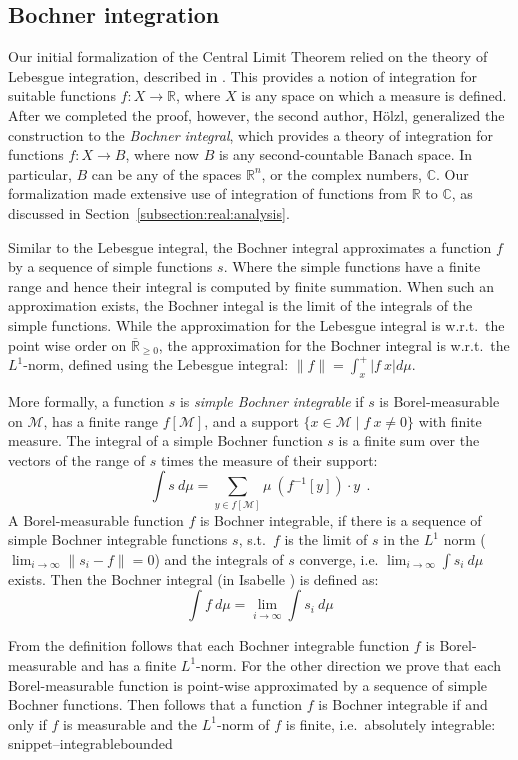 \documentclass{svjour3}
\newcommand{\RR}{\mathbb{R}}
\newcommand{\CC}{\mathbb{C}}
\newcommand{\ennRR}{\overline{\mathbb{R}}_{\ge 0}}
\newcommand{\mdl}[1]{{\mathcal #1}} %
\newcommand{\Snippet}[1]{\csname snippet--#1\endcsname}
\begin{document}
\subsection{Bochner integration}
\label{subsection:bochner}

Our initial formalization of the Central Limit Theorem relied on the theory of Lebesgue integration, described in \cite{hoelzl:heller:11}. This provides a notion of integration for suitable functions $f : X \to \RR$, where $X$ is any space on which a measure is defined. After we completed the proof, however, the second author, H\"olzl, generalized the construction to the \emph{Bochner integral}, which provides a theory of integration for functions $f : X \to B$, where now $B$ is any second-countable Banach space. In particular, $B$ can be any of the spaces $\RR^n$, or the complex numbers, $\CC$. Our formalization made extensive use of integration of functions from $\RR$ to $\CC$, as discussed in Section~\ref{subsection:real:analysis}.

Similar to the Lebesgue integral, the Bochner integral approximates a function $f$ by a sequence of simple functions $s$. Where the simple functions have a finite range and hence their integral is computed by finite summation. When such an approximation exists, the Bochner integal is the limit of the integrals of the simple functions. While the approximation for the Lebesgue integral is w.r.t.~the point wise order on $\ennRR$, the approximation for the Bochner integral is w.r.t.~the $L^1$-norm, defined using the Lebesgue integral: $\lVert f \rVert = \int_x^+ |f~x| d\mu$.

More formally, a function $s$ is \emph{simple Bochner integrable} if $s$ is Borel-measurable on $\mdl M$, has a finite range $f[\mdl M]$, and a support $\{x \in \mdl M \mid f~x \not= 0\}$ with finite measure. The integral of a simple Bochner function $s$ is a finite sum over the vectors of the range of $s$ times the measure of their support:
\[ \int s~d\mu = \sum_{ y \in f[\mdl M]} \mu~(f^{-1}[y]) \cdot y~~.\]
A Borel-measurable function $f$ is Bochner integrable, if there is a sequence of simple Bochner integrable functions $s$, s.t.~$f$ is the limit of $s$ in the $L^1$ norm ($\lim_{i \rightarrow \infty} \lVert s_i - f \rVert = 0$) and the integrals of $s$ converge, i.e. $\lim_{i \rightarrow \infty} \int s_i ~d\mu$ exists. Then the Bochner integral (in Isabelle ) is defined as:
\[ \int f~d\mu = \lim_{i \rightarrow \infty} \int s_i ~d\mu \]

From the definition follows that each Bochner integrable function $f$ is Borel-measurable and has a finite $L^1$-norm. For the other direction we prove that each Borel-measurable function is point-wise approximated by a sequence of simple Bochner functions. Then follows that a function $f$ is Bochner integrable if and only if $f$ is measurable and the $L^1$-norm of $f$ is finite, i.e.~absolutely integrable:
\Snippet{integrablebounded}
\end{document}
